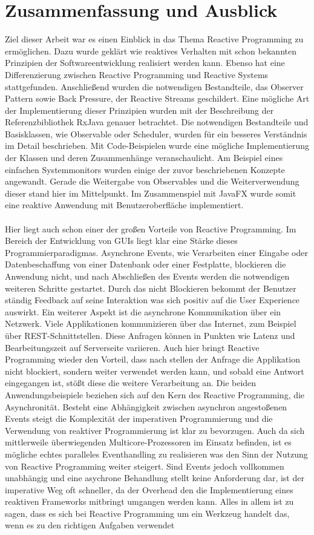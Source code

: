 \chapter{Zusammenfassung und Ausblick}\label{eval}
Ziel dieser Arbeit war es einen Einblick in das Thema Reactive Programming zu ermöglichen. Dazu wurde geklärt wie reaktives Verhalten mit schon bekannten Prinzipien der Softwareentwicklung realisiert werden kann. Ebenso hat eine Differenzierung zwischen Reactive Programming und Reactive Systems stattgefunden. Anschließend wurden die notwendigen Bestandteile, das Observer Pattern sowie Back Pressure, der Reactive Streams geschildert. Eine mögliche Art der Implementierung dieser Prinzipien wurden mit der Beschreibung der Referenzbibliothek RxJava genauer betrachtet. Die notwendigen Bestandteile und Basisklassen, wie Observable oder Scheduler, wurden für ein besseres Verständnis im Detail beschrieben. Mit Code-Beispielen wurde eine mögliche Implementierung der Klassen und deren Zusammenhänge veranschaulicht. Am Beispiel eines einfachen Systemmonitors wurden einige der zuvor beschriebenen Konzepte angewandt. Gerade die Weitergabe von Observables und die Weiterverwendung dieser stand hier im Mittelpunkt. Im Zusammenspiel mit JavaFX wurde somit eine reaktive Anwendung mit Benutzeroberfläche implementiert. \\ \\ Hier liegt auch schon einer der großen Vorteile von Reactive Programming. Im Bereich der Entwicklung von GUIs liegt klar eine Stärke dieses Programmierparadigmas. Asynchrone Events, wie Verarbeiten einer Eingabe oder Datenbeschaffung von einer Datenbank oder einer Festplatte, blockieren die Anwendung nicht, und nach Abschließen des Events werden die notwendigen weiteren Schritte gestartet. Durch das nicht Blockieren bekommt der Benutzer ständig Feedback auf seine Interaktion was sich positiv auf die User Experience auswirkt. Ein weiterer Aspekt ist die asynchrone Kommunikation über ein Netzwerk. Viele Applikationen kommunizieren über das Internet, zum Beispiel über REST-Schnittstellen. Diese Anfragen können in Punkten wie Latenz und Bearbeitungszeit auf Serverseite variieren. Auch hier bringt Reactive Programming wieder den Vorteil, dass nach stellen der Anfrage die Applikation nicht blockiert, sondern weiter verwendet werden kann, und sobald eine Antwort eingegangen ist, stößt diese die weitere Verarbeitung an. Die beiden Anwendungsbeispiele beziehen sich auf den Kern des Reactive Programming, die Asynchronität. Besteht eine Abhängigkeit zwischen asynchron angestoßenen Events steigt die Komplexität der imperativen Programmierung und die Verwendung von reaktiver Programmierung ist klar zu bevorzugen. Auch da sich mittlerweile überwiegenden Multicore-Prozessoren im Einsatz befinden, ist es mögliche echtes paralleles Eventhandling zu realisieren was den Sinn der Nutzung von Reactive Programming weiter steigert. Sind Events jedoch vollkommen unabhängig und eine asychrone Behandlung stellt keine Anforderung dar, ist der imperative Weg oft schneller, da der Overhead den die Implementierung eines reaktiven Frameworks mitbringt umgangen werden kann. Alles in allem ist zu sagen, dass es sich bei Reactive Programming um ein Werkzeug handelt das, wenn es zu den richtigen Aufgaben verwendet 